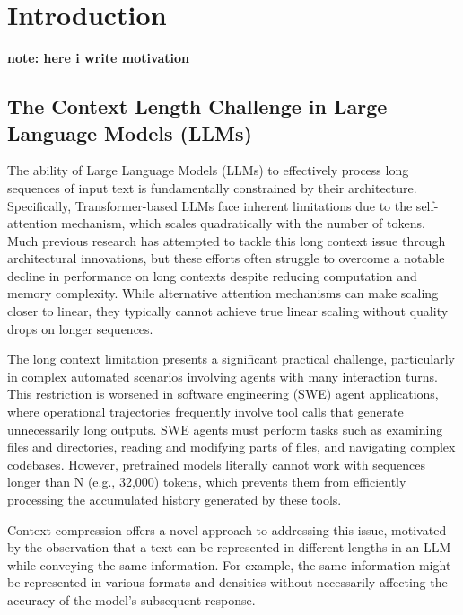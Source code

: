 \chapter{Introduction}

\textbf{note: here i write motivation}


\section{The Context Length Challenge in Large Language Models (LLMs)}

The ability of Large Language Models (LLMs) to effectively process long sequences of input text is fundamentally constrained by their architecture.
Specifically, Transformer-based LLMs face inherent limitations due to the self-attention mechanism, which scales quadratically with the number of tokens.
Much previous research has attempted to tackle this long context issue through architectural innovations, but these efforts often struggle to overcome a notable decline in performance on long contexts despite reducing computation and memory complexity.
While alternative attention mechanisms can make scaling closer to linear, they typically cannot achieve true linear scaling without quality drops on longer sequences.

The long context limitation presents a significant practical challenge, particularly in complex automated scenarios involving agents with many interaction turns.
This restriction is worsened in software engineering (SWE) agent applications, where operational trajectories frequently involve tool calls that generate unnecessarily long outputs.
SWE agents must perform tasks such as examining files and directories, reading and modifying parts of files, and navigating complex codebases.
However, pretrained models literally cannot work with sequences longer than N (e.g., 32,000) tokens, which prevents them from efficiently processing the accumulated history generated by these tools.

Context compression offers a novel approach to addressing this issue, motivated by the observation that a text can be represented in different lengths in an LLM while conveying the same information.
For example, the same information might be represented in various formats and densities without necessarily affecting the accuracy of the model's subsequent response.

